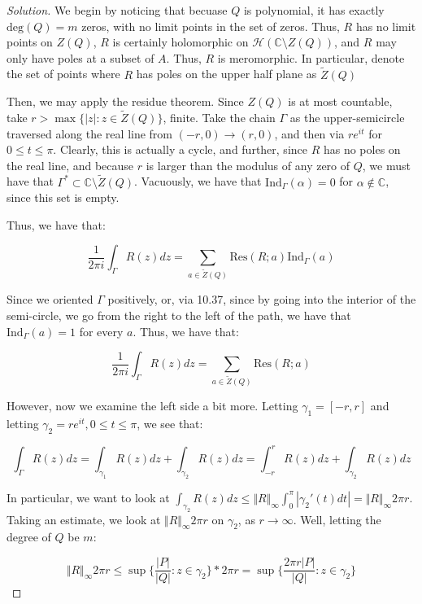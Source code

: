 \documentclass[10pt]{article}
\begin{document}
\begin{proof}[Solution]

We begin by noticing that becuase $Q$ is polynomial, it has exactly $\text{deg}(Q) = m$ zeros, with no limit points in the set of zeros. Thus, $R$ has no limit points on $Z(Q)$, $R$ is certainly holomorphic on $\mathcal{H}(\mathbb{C} \setminus Z(Q))$, and $R$ may only have poles at a subset of $A$. Thus, $R$ is meromorphic. In particular, denote the set of points where $R$ has poles on the upper half plane as $\tilde{Z}(Q)$

Then, we may apply the residue theorem. Since $Z(Q)$ is at most countable, take $r > \max \{ |z| : z \in \tilde{Z}(Q) \}$, finite. Take the chain $\Gamma$ as the upper-semicircle traversed along the real line from $(-r,0) \to (r,0)$, and then via $re^{i t}$ for $0 \leq t \leq \pi$. Clearly, this is actually a cycle, and further, since $R$ has no poles on the real line, and because $r$ is larger than the modulus of any zero of $Q$, we must have that $\Gamma^* \subset \mathbb{C} \setminus \tilde{Z}(Q)$. Vacuously, we have that $\text{Ind}_\Gamma(\alpha) = 0$ for $\alpha \not \in \mathbb{C}$, since this set is empty.

Thus, we have that:

$$\frac{1}{2\pi i} \int_\Gamma R(z) dz = \sum_{a \in \tilde{Z}(Q)} \text{Res}(R; a) \text{Ind}_\Gamma(a) $$

Since we oriented $\Gamma$ positively, or, via 10.37, since by going into the interior of the semi-circle, we go from the right to the left of the path, we have that $\text{Ind}_\Gamma(a) = 1$ for every $a$. Thus, we have that:

$$\frac{1}{2\pi i} \int_\Gamma R(z) dz = \sum_{a \in \tilde{Z}(Q)} \text{Res}(R; a) $$

However, now we examine the left side a bit more. Letting $\gamma_1 = [-r,r]$ and letting $\gamma_2 = re^{it}, 0 \leq t \leq \pi$, we see that:

$$\int_\Gamma R(z) dz = \int_{\gamma_1} R(z)dz + \int_{\gamma_2} R(z)dz = \int_{-r}^r R(z) dz + \int_{\gamma_2} R(z) dz$$

In particular, we want to look at $\int_{\gamma_2} R(z) dz \leq \Vert R \Vert_\infty \int_0^\pi | \gamma_2'(t) dt| = \Vert R \Vert_\infty 2\pi r$. Taking an estimate, we look at $\Vert R \Vert_\infty 2\pi r$ on $\gamma_2$, as $r \to \infty$. Well, letting the degree of $Q$ be $m$:

$$ \Vert R \Vert_\infty 2\pi r \leq \sup \{  \frac{ |P|}{|Q|} : z \in \gamma_2 \} * 2\pi r =  \sup \{  \frac{2\pi r |P|}{|Q|} : z \in \gamma_2 \}$$


\end{proof}
\end{document}
